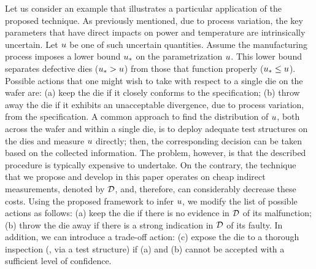 Let us consider an example that illustrates a particular application of the proposed technique. As previously mentioned, due to process variation, the key parameters that have direct impacts on power and temperature are intrinsically uncertain. Let $u$ be one of such uncertain quantities. Assume the manufacturing process imposes a lower bound $u_*$ on the parametrization $u$. This lower bound separates defective dies ($u_* > u$) from those that function properly ($u_* \leq u$). Possible actions that one might wish to take with respect to a single die on the wafer are: (a) keep the die if it closely conforms to the specification; (b) throw away the die if it exhibits an unacceptable divergence, due to process variation, from the specification. A common approach to find the distribution of $u$, both across the wafer and within a single die, is to deploy adequate test structures on the dies and measure $u$ directly; then, the corresponding decision can be taken based on the collected information. The problem, however, is that the described procedure is typically expensive to undertake. On the contrary, the technique that we propose and develop in this paper operates on cheap indirect measurements, denoted by $\mathcal{D}$, and, therefore, can considerably decrease these costs. Using the proposed framework to infer $u$, we modify the list of possible actions as follows: (a) keep the die if there is no evidence in $\mathcal{D}$ of its malfunction; (b) throw the die away if there is a strong indication in $\mathcal{D}$ of its faulty. In addition, we can introduce a trade-off action: (c) expose the die to a thorough inspection (\eg, via a test structure) if (a) and (b) cannot be accepted with a sufficient level of confidence.
